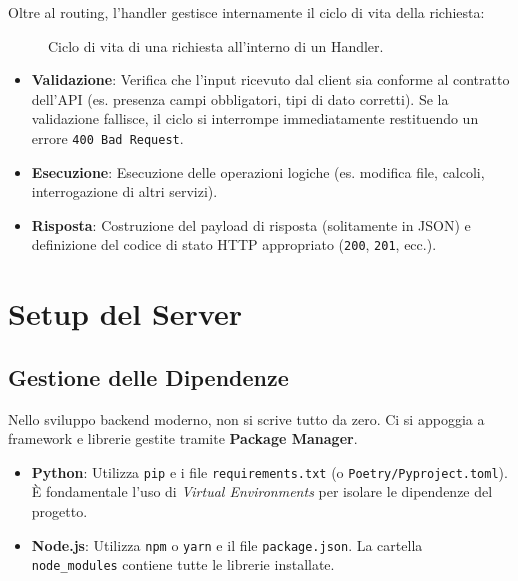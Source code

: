 \documentclass[11pt,a4paper]{report}
\begin{document}
Oltre al routing, l'handler gestisce internamente il ciclo di vita della richiesta:

\begin{figure}[ht]
\centering
{}
\caption{Ciclo di vita di una richiesta all'interno di un Handler.}
\end{figure}

\begin{itemize}[leftmargin=3em]
    \item \textbf{Validazione}: Verifica che l'input ricevuto dal client sia conforme al contratto dell'API (es. presenza campi obbligatori, tipi di dato corretti). Se la validazione fallisce, il ciclo si interrompe immediatamente restituendo un errore \texttt{400 Bad Request}.
    \item \textbf{Esecuzione}: Esecuzione delle operazioni logiche (es. modifica file, calcoli, interrogazione di altri servizi).
    \item \textbf{Risposta}: Costruzione del payload di risposta (solitamente in JSON) e definizione del codice di stato HTTP appropriato (\texttt{200}, \texttt{201}, ecc.).
\end{itemize}


\chapter{Setup del Server}

\section{Gestione delle Dipendenze}
Nello sviluppo backend moderno, non si scrive tutto da zero. Ci si appoggia a framework e librerie gestite tramite \textbf{Package Manager}.
\begin{itemize}
    \item \textbf{Python}: Utilizza \texttt{pip} e i file \texttt{requirements.txt} (o \texttt{Poetry/Pyproject.toml}). \`E fondamentale l'uso di \textit{Virtual Environments} per isolare le dipendenze del progetto.
    \item \textbf{Node.js}: Utilizza \texttt{npm} o \texttt{yarn} e il file \texttt{package.json}. La cartella \texttt{node\_modules} contiene tutte le librerie installate.
\end{itemize}
\end{document}
